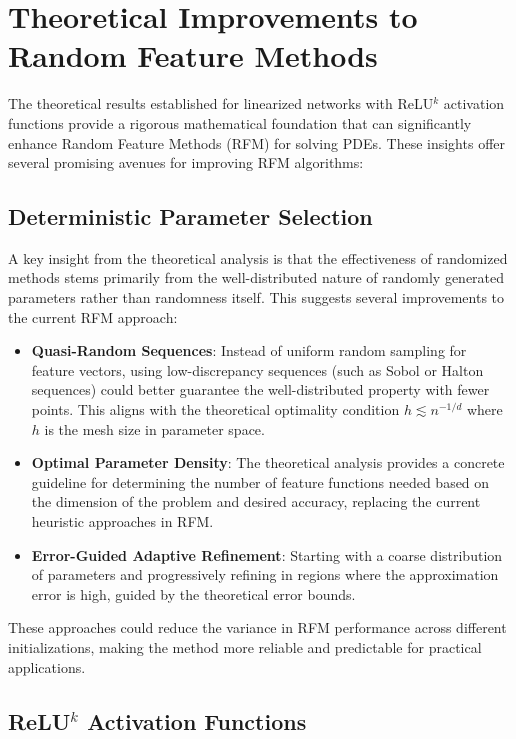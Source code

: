 \documentclass[11pt]{article}
\begin{document}
\section{Theoretical Improvements to Random Feature Methods}

The theoretical results established for linearized networks with ReLU$^k$ activation functions provide a rigorous mathematical foundation that can significantly enhance Random Feature Methods (RFM) for solving PDEs. These insights offer several promising avenues for improving RFM algorithms:

\subsection{Deterministic Parameter Selection}

A key insight from the theoretical analysis is that the effectiveness of randomized methods stems primarily from the well-distributed nature of randomly generated parameters rather than randomness itself. This suggests several improvements to the current RFM approach:

\begin{itemize}
    \item \textbf{Quasi-Random Sequences}: Instead of uniform random sampling for feature vectors, using low-discrepancy sequences (such as Sobol or Halton sequences) could better guarantee the well-distributed property with fewer points. This aligns with the theoretical optimality condition $h \lesssim n^{-1/d}$ where $h$ is the mesh size in parameter space.
    
    \item \textbf{Optimal Parameter Density}: The theoretical analysis provides a concrete guideline for determining the number of feature functions needed based on the dimension of the problem and desired accuracy, replacing the current heuristic approaches in RFM.
    
    \item \textbf{Error-Guided Adaptive Refinement}: Starting with a coarse distribution of parameters and progressively refining in regions where the approximation error is high, guided by the theoretical error bounds.
\end{itemize}

These approaches could reduce the variance in RFM performance across different initializations, making the method more reliable and predictable for practical applications.

\subsection{ReLU$^k$ Activation Functions}
\end{document}
